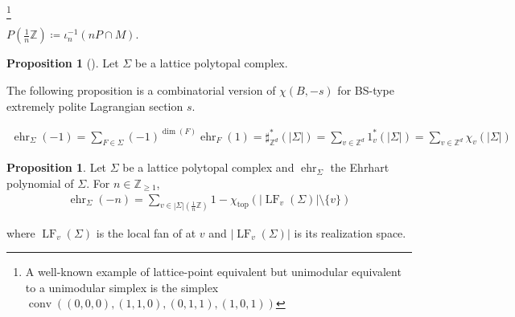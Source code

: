 \documentclass[a4paper,dvipdfmx,reqno,12pt]{amsart}
\theoremstyle{definition}
\newtheorem{Prop}[Thm]{Proposition}
\newcommand{\deq}{\coloneqq}
\newcommand{\Z}{\mathbb{Z}}%
\newcommand{\opn}[1]{\operatorname{#1}}
\numberwithin{equation}{section}
\begin{document}
\footnote{A well-known example of lattice-point equivalent
but unimodular equivalent to a unimodular simplex is the simplex
$\opn{conv}((0,0,0),(1,1,0),(0,1,1),(1,0,1))$}

$P(\frac{1}{n}\Z)\deq \iota^{-1}_{n}(nP\cap M)$.

  \begin{Prop}[{\cite[{$(3\!\cdot\!1)$}]{MR154188}}]
    Let $\Sigma$ be a lattice polytopal complex.
  \end{Prop}

  The following proposition is a combinatorial version of $\chi(B,-s)$ for
  BS-type extremely polite Lagrangian section $s$.


\begin{align}
  \opn{ehr}_{\Sigma}(-1)=\sum_{F\in \Sigma}(-1)^{\dim(F)}\opn{ehr}_{F}(1)
  =\sharp_{\Z^{d}}^{*}(|\Sigma|)
  =\sum_{v\in \Z^{d}} 1_{v}^{*}(|\Sigma|)
  =\sum_{v\in \Z^{d}}\chi_v(|\Sigma|)
\end{align}

\begin{Prop}
  Let $\Sigma$ be a lattice polytopal complex and
  $\opn{ehr}_{\Sigma}$ the Ehrhart polynomial of $\Sigma$.
  For $n\in \Z_{\geq 1}$,
  \begin{align}
    \opn{ehr}_{\Sigma}(-n)=\sum_{v\in|\Sigma|(\frac{1}{n}\Z)}
    1-\chi_{\opn{top}}(|\opn{LF}_v(\Sigma)|\setminus \{v\})
  \end{align}

  where $\opn{LF}_v(\Sigma)$ is the local fan of at $v$ and
  $|\opn{LF}_v(\Sigma)|$ is its realization space.

\end{Prop}
\end{document}
